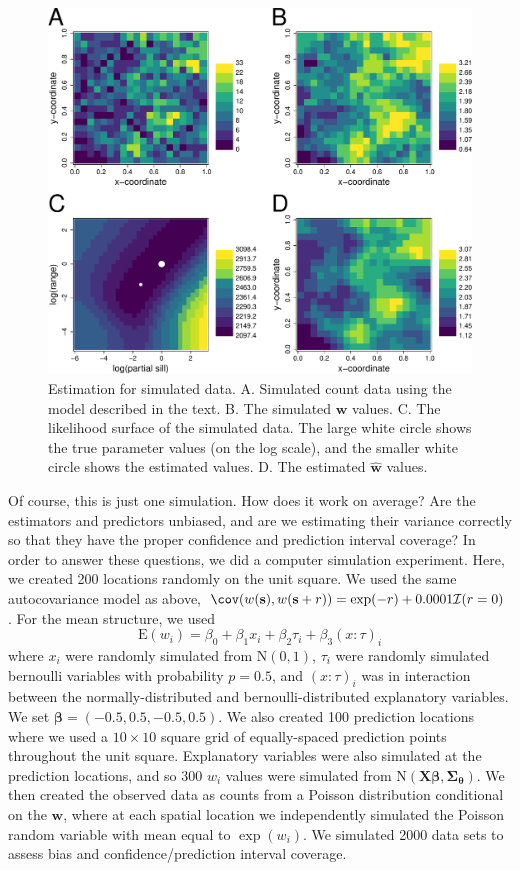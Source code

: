 \documentclass[12pt, titlepage]{article}
\begin{document}
\begin{figure}[H]
  \begin{center}
	    \includegraphics[width=.8\linewidth]{figures/sglm_likelihood_estimation}
  \end{center}
  \caption{Estimation for simulated data. A. Simulated count data using the model described in the text.  B. The simulated $\mathbf{w}$ values. C. The likelihood surface of the simulated data.  The large white circle shows the true parameter values (on the log scale), and the smaller white circle shows the estimated values.  D. The estimated $\hat{\mathbf{w}}$ values. \label{Fig:sglm_likelihood_estimation}}
\end{figure}

Of course, this is just one simulation.  How does it work on average?  Are the estimators and predictors unbiased, and are we estimating their variance correctly so that they have the proper confidence and prediction interval coverage?  In order to answer these questions, we did a computer simulation experiment.  Here, we created 200 locations randomly on the unit square. We used the same autocovariance model as above, $\cov(w(\mathbf{s}),w(\mathbf{s} + r)) = \exp(-r) + 0.0001\mathcal{I}(r = 0)$.  For the mean structure, we used
$$
\textrm{E}(w_{i}) = \beta_{0} + \beta_{1}x_{i} + \beta_{2}\tau_{i} + \beta_{3}(x{:}\tau)_{i}
$$
where $x_{i}$ were randomly simulated from $\textrm{N}(0,1)$, $\tau_{i}$ were randomly simulated bernoulli variables with probability $p = 0.5$, and $(x{:}\tau)_{i}$ was in interaction between the normally-distributed and bernoulli-distributed explanatory variables.  We set $\mathbf{\beta} = (-0.5, 0.5, -0.5, 0.5)$.  We also created 100 prediction locations where we used a $10 \times 10$ square grid of equally-spaced prediction points throughout the unit square.  Explanatory variables were also simulated at the prediction locations, and so 300 $w_{i}$ values were simulated from $\textrm{N}(\mathbf{X}\boldsymbol{\beta},\boldsymbol{\Sigma}_{\boldsymbol{\theta}})$. We then created the observed data as counts from a Poisson distribution conditional on the $\mathbf{w}$, where at each spatial location we independently simulated the Poisson random variable with mean equal to $\exp(w_{i})$.  We simulated 2000 data sets to assess bias and confidence/prediction interval coverage.
\end{document}

